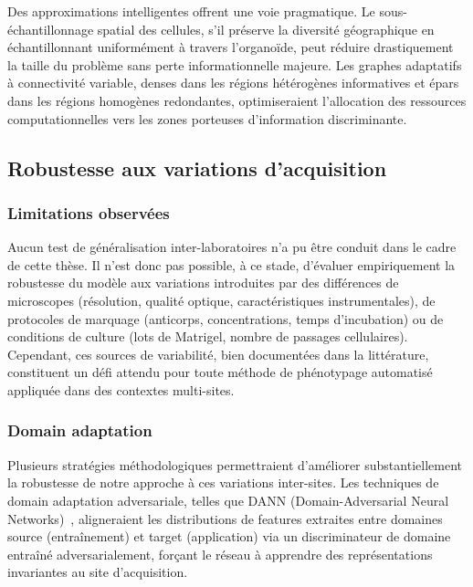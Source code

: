 Des approximations intelligentes offrent une voie pragmatique. Le sous-échantillonnage spatial des cellules, s'il préserve la diversité géographique en échantillonnant uniformément à travers l'organoïde, peut réduire drastiquement la taille du problème sans perte informationnelle majeure. Les graphes adaptatifs à connectivité variable, denses dans les régions hétérogènes informatives et épars dans les régions homogènes redondantes, optimiseraient l'allocation des ressources computationnelles vers les zones porteuses d'information discriminante.

\subsection{Robustesse aux variations d'acquisition}

\subsubsection{Limitations observées}

Aucun test de généralisation inter-laboratoires n’a pu être conduit dans le cadre de cette thèse. Il n’est donc pas possible, à ce stade, d’évaluer empiriquement la robustesse du modèle aux variations introduites par des différences de microscopes (résolution, qualité optique, caractéristiques instrumentales), de protocoles de marquage (anticorps, concentrations, temps d’incubation) ou de conditions de culture (lots de Matrigel, nombre de passages cellulaires). Cependant, ces sources de variabilité, bien documentées dans la littérature, constituent un défi attendu pour toute méthode de phénotypage automatisé appliquée dans des contextes multi-sites.

\subsubsection{Domain adaptation}

Plusieurs stratégies méthodologiques permettraient d'améliorer substantiellement la robustesse de notre approche à ces variations inter-sites. Les techniques de domain adaptation adversariale, telles que DANN (Domain-Adversarial Neural Networks)~\cite{Ganin2015,Ganin2016}, aligneraient les distributions de features extraites entre domaines source (entraînement) et target (application) via un discriminateur de domaine entraîné adversarialement, forçant le réseau à apprendre des représentations invariantes au site d'acquisition.

